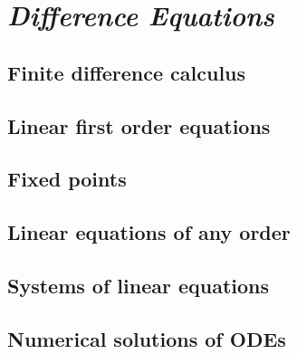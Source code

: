 \chapter{\emph{Difference Equations}} 
\label{differenceeqs}

\section{Finite difference calculus}
\section{Linear first order equations}
\section{Fixed points}
\section{Linear equations of any order}
\section{Systems of linear equations}
\section{Numerical solutions of ODEs}